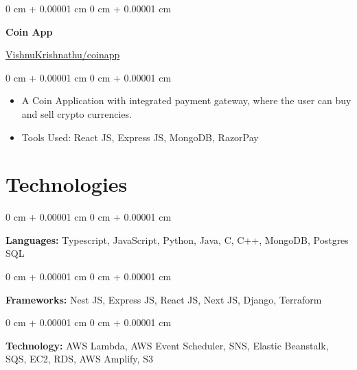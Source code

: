 \documentclass[10pt, letterpaper]{article}
\newenvironment{highlights}{
    \begin{itemize}[
        topsep=0.10 cm,
        parsep=0.10 cm,
        partopsep=0pt,
        itemsep=0pt,
        leftmargin=0 cm + 10pt
    ]
}{
    \end{itemize}
} %
\newenvironment{onecolentry}{
    \begin{adjustwidth}{
        0 cm + 0.00001 cm
    }{
        0 cm + 0.00001 cm
    }
}{
    \end{adjustwidth}
} %
\newenvironment{twocolentry}[2][]{
    \onecolentry
    \def\secondColumn{#2}
    \setcolumnwidth{\fill, 4.5 cm}
    \begin{paracol}{2}
}{
    \switchcolumn \raggedleft \secondColumn
    \end{paracol}
    \endonecolentry
} %
\begin{document}
        \vspace{0.2 cm}

        \begin{twocolentry}{
            \href{https://vishnukrishnathu.github.io/coinapp/}{VishnuKrishnathu/coinapp}
        }
            \textbf{Coin App}
        \end{twocolentry}

        \vspace{0.10 cm}
        \begin{onecolentry}
            \begin{highlights}
                \item A Coin Application with integrated payment gateway, where the user can buy and sell crypto currencies.
                \item Tools Used: React JS, Express JS, MongoDB, RazorPay
            \end{highlights}
        \end{onecolentry}


        \vspace{0.2 cm}
    
    \section{Technologies}



        
        \begin{onecolentry}
            \textbf{Languages:} Typescript, JavaScript, Python, Java, C, C++, MongoDB, Postgres SQL
        \end{onecolentry}

        \vspace{0.2 cm}

        \begin{onecolentry}
            \textbf{Frameworks:} Nest JS, Express JS, React JS, Next JS, Django, Terraform
        \end{onecolentry}
        \vspace{0.2 cm}
        \begin{onecolentry}
            \textbf{Technology:} AWS Lambda, AWS Event Scheduler, SNS, Elastic Beanstalk, SQS, EC2, RDS, AWS Amplify, S3
        \end{onecolentry}

    
\end{document}
